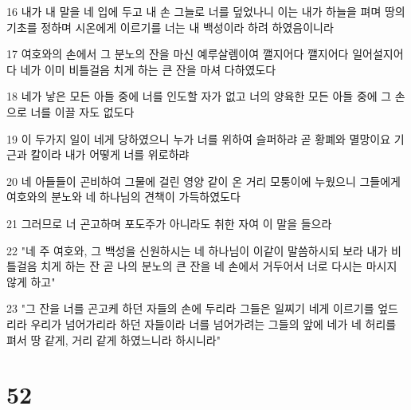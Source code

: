 \par 16 내가 내 말을 네 입에 두고 내 손 그늘로 너를 덮었나니 이는 내가 하늘을 펴며 땅의 기초를 정하며 시온에게 이르기를 너는 내 백성이라 하려 하였음이니라
\par 17 여호와의 손에서 그 분노의 잔을 마신 예루살렘이여 깰지어다 깰지어다 일어설지어다 네가 이미 비틀걸음 치게 하는 큰 잔을 마셔 다하였도다
\par 18 네가 낳은 모든 아들 중에 너를 인도할 자가 없고 너의 양육한 모든 아들 중에 그 손으로 너를 이끌 자도 없도다
\par 19 이 두가지 일이 네게 당하였으니 누가 너를 위하여 슬퍼하랴 곧 황폐와 멸망이요 기근과 칼이라 내가 어떻게 너를 위로하랴
\par 20 네 아들들이 곤비하여 그물에 걸린 영양 같이 온 거리 모퉁이에 누웠으니 그들에게 여호와의 분노와 네 하나님의 견책이 가득하였도다
\par 21 그러므로 너 곤고하며 포도주가 아니라도 취한 자여 이 말을 들으라
\par 22 "네 주 여호와, 그 백성을 신원하시는 네 하나님이 이같이 말씀하시되 보라 내가 비틀걸음 치게 하는 잔 곧 나의 분노의 큰 잔을 네 손에서 거두어서 너로 다시는 마시지 않게 하고"
\par 23 "그 잔을 너를 곤고케 하던 자들의 손에 두리라 그들은 일찌기 네게 이르기를 엎드리라 우리가 넘어가리라 하던 자들이라 너를 넘어가려는 그들의 앞에 네가 네 허리를 펴서 땅 같게, 거리 같게 하였느니라 하시니라"

\chapter{52}

